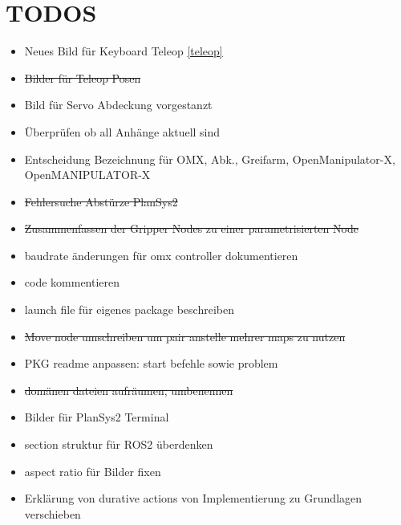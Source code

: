 \section{TODOS}
\begin{itemize}
\item Neues Bild für Keyboard Teleop \ref{teleop}
\item \sout{Bilder für Teleop Posen}
\item Bild für Servo Abdeckung vorgestanzt
\item Überprüfen ob all Anhänge aktuell sind
\item Entscheidung Bezeichnung für OMX, Abk., Greifarm, OpenManipulator-X, OpenMANIPULATOR-X
\item \sout{Fehlersuche Abstürze PlanSys2}
\item \sout{Zusammenfassen der Gripper Nodes zu einer parametrisierten Node}
\item baudrate änderungen für omx controller dokumentieren
\item code kommentieren
\item launch file für eigenes package beschreiben
\item \sout{Move node umschreiben um pair anstelle mehrer maps zu nutzen}
\item PKG readme anpassen: start befehle sowie problem
\item \sout{domänen dateien aufräumen, umbenennen}
\item Bilder für PlanSys2 Terminal
\item section struktur für ROS2 überdenken
\item aspect ratio für Bilder fixen
    \item Erklärung von durative actions von Implementierung zu Grundlagen verschieben
\end{itemize}